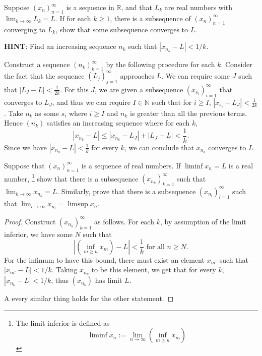 \documentclass[../main.tex]{subfiles}
\begin{document}
\begin{problem}[\S2.7 I]
Suppose $(x_n)_{n = 1}^\infty$ is a sequence in $\mathbb{R}$, and that $L_k$ are real numbers with $\lim_{k \to \infty} L_k = L$.
If for each $k \ge 1$, there is a subsequence of $(x_n)_{n = 1}^\infty$ converging to $L_k$, show that some subsequence converges to $L$.

\textbf{HINT}: Find an increasing sequence $n_k$ such that $|x_{n_k} - L| < 1/k$.
\end{problem}
Construct a sequence $(n_k)_{k = 1}^\infty$ by the following procedure for each $k$.
Consider the fact that the sequence $(L_j)_{j = 1}^\infty$ approaches $L$.
We can require some $J$ such that $|L_{J} - L| < \frac{1}{2k}$.
For this $J$, we are given a subsequence $(x_{s_{i}})_{i = 1}^\infty$ that converges to $L_J$, and thus we can require $I \in \mathbb{N}$ such that for $i \ge I$, $|x_{s_i} - L_J| < \frac{1}{2k}$.
Take $n_k$ as some $s_i$ where $i \ge I$ and $n_k$ is greater than all the previous terms.
Hence $(n_k)$ satisfies an increasing sequence where for each $k$,
\[
	|x_{n_k} - L| \le |x_{n_k} - L_J| + |L_J - L| < \frac{1}{k}.
\]
Since we have $|x_{n_k} - L| < \frac{1}{k}$ for every $k$, we can conclude that $x_{n_k}$ converges to $L$.

\begin{problem}[\S2.7 J]
Suppose that $(x_n)_{n = 1}^\infty$ is a sequence of real numbers.
If $\liminf x_n = L$
is a real number,
\footnote{The limit inferior is defined as
\[
    \liminf x_n := \lim_{n \to \infty} \left(\inf_{m \ge n} x_m\right)
\]
}
show that there is a subsequence $(x_{n_k})_{k = 1}^\infty$ such that $\lim_{k \to \infty} x_{n_k} = L$.
Similarly, prove that there is a subsequence $(x_{n_l})_{l = 1}^\infty$ such that $\lim_{l \to \infty} x_{n_l} = \limsup x_n$.
\end{problem}

\begin{proof}
    Construct $(x_{n_k})_{k = 1}^\infty$ as follows.
    For each $k$, by assumption of the limit inferior, we have some $N$ such that
    \[
        \left|\left(\inf_{m \ge n} x_m\right) - L\right| < \frac{1}{k} \text{ for all } n \ge N.
    \]
    For the infimum to have this bound, there must exist an element $x_{m'}$ such that $|x_{m'} - L| < 1/k$.
    Taking $x_{n_k}$ to be this element, we get that for every $k$, $|x_{n_k} - L| < 1/k$, thus $(x_{n_k})$ has limit $L$.

    A every similar thing holds for the other statement.
\end{proof}
\end{document}
